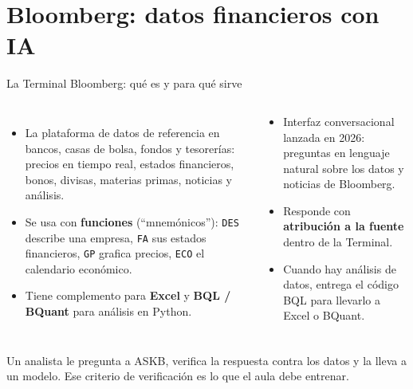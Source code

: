 \documentclass[aspectratio=169,10pt]{beamer}
\begin{document}
\section{Bloomberg: datos financieros con IA}

\begin{frame}{La Terminal Bloomberg: qué es y para qué sirve}
\begin{columns}[T]
\begin{itemize}\small
  \item La plataforma de datos de referencia en bancos, casas de bolsa, fondos y tesorerías: precios en tiempo real, estados financieros, bonos, divisas, materias primas, noticias y análisis.
  \item Se usa con \textbf{funciones} (``mnemónicos''): \texttt{DES} describe una empresa, \texttt{FA} sus estados financieros, \texttt{GP} grafica precios, \texttt{ECO} el calendario económico.
  \item Tiene complemento para \textbf{Excel} y \textbf{BQL / BQuant} para análisis en Python.
\end{itemize}
\begin{tcolorbox}[enhanced,colback=white,colframe=Pr,arc=2mm,
  title={\faRobot\ ASKB: la IA dentro de Bloomberg},fonttitle=\bfseries\color{white},colbacktitle=Pr]
\footnotesize
\begin{itemize}
  \item Interfaz conversacional lanzada en 2026: preguntas en lenguaje natural sobre los datos y noticias de Bloomberg.
  \item Responde con \textbf{atribución a la fuente} dentro de la Terminal.
  \item Cuando hay análisis de datos, entrega el código BQL para llevarlo a Excel o BQuant.
\end{itemize}
\end{tcolorbox}
\end{columns}
\vspace{2pt}
\begin{probox}
\small Un analista le pregunta a ASKB, verifica la respuesta contra los datos y la lleva a un modelo. Ese criterio de verificación es lo que el aula debe entrenar.
\end{probox}
\end{frame}
\end{document}
